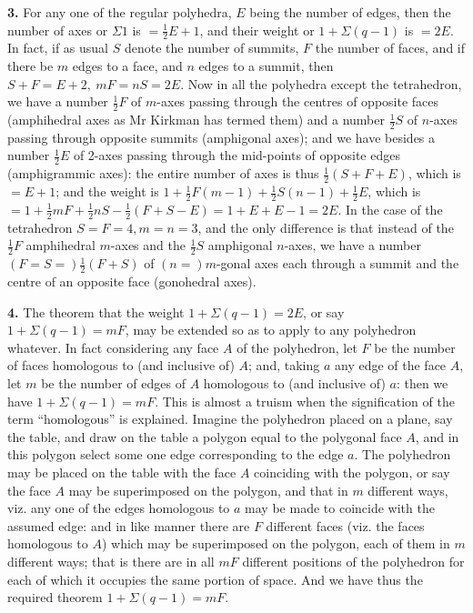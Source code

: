 \documentclass[11pt]{article}
\begin{document}
\textbf{3.} For any one of the regular polyhedra, $E$ being the number of edges, then the number of axes or $\Sigma 1$ is $= \tfrac{1}{2}E + 1$, and their weight or $1 + \Sigma(q - 1)$ is $= 2E$. In fact, if as usual $S$ denote the number of summits, $F$ the number of faces, and if there be $m$ edges to a face, and $n$ edges to a summit, then $S + F = E + 2,\ mF = nS = 2E$. Now in all the polyhedra except the tetrahedron, we have a number $\tfrac{1}{2}F$ of $m$-axes passing through the centres of opposite faces (amphihedral axes as Mr Kirkman has termed them) and a number $\tfrac{1}{2}S$ of $n$-axes passing through opposite summits (amphigonal axes); and we have besides a number $\tfrac{1}{2}E$ of 2-axes passing through the mid-points of opposite edges (amphigrammic axes): the entire number of axes is thus $\tfrac{1}{2}(S + F + E)$, which is $= E + 1$; and the weight is $1 + \tfrac{1}{2}F(m - 1) + \tfrac{1}{2}S(n - 1) + \tfrac{1}{2}E$, which is $= 1 + \tfrac{1}{2}mF + \tfrac{1}{2}nS - \tfrac{1}{2}(F + S - E) = 1 + E + E - 1 = 2E$. In the case of the tetrahedron $S = F = 4, m = n = 3$, and the only difference is that instead of the $\tfrac{1}{2}F$ amphihedral $m$-axes and the $\tfrac{1}{2}S$ amphigonal $n$-axes, we have a number $(F = S =)\tfrac{1}{2}(F + S)$ of $(n =) m$-gonal axes each through a summit and the centre of an opposite face (gonohedral axes).

\textbf{4.} The theorem that the weight $1 + \Sigma(q - 1) = 2E$, or say $1 + \Sigma(q - 1) = mF$, may be extended so as to apply to any polyhedron whatever. In fact considering any face $A$ of the polyhedron, let $F$ be the number of faces homologous to (and inclusive of) $A$; and, taking $a$ any edge of the face $A$, let $m$ be the number of edges of $A$ homologous to (and inclusive of) $a$: then we have $1 + \Sigma(q - 1) = mF$. This is almost a truism when the signification of the term ``homologous'' is explained. Imagine the polyhedron placed on a plane, say the table, and draw on the table a polygon equal to the polygonal face $A$, and in this polygon select some one edge corresponding to the edge $a$. The polyhedron may be placed on the table with the face $A$ coinciding with the polygon, or say the face $A$ may be superimposed on the polygon, and that in $m$ different ways, viz. any one of the edges homologous to $a$ may be made to coincide with the assumed edge: and in like manner there are $F$ different faces (viz. the faces homologous to $A$) which may be superimposed on the polygon, each of them in $m$ different ways; that is there are in all $mF$ different positions of the polyhedron for each of which it occupies the same portion of space. And we have thus the required theorem $1 + \Sigma(q - 1) = mF$.
\end{document}

